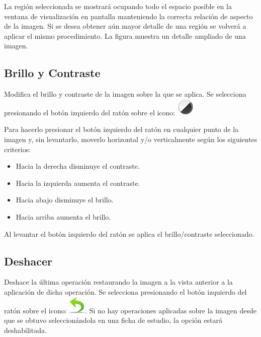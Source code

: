 \documentclass{plantilla-manual-usuario}
\begin{document}
La región seleccionada se mostrará ocupando todo el espacio posible en la ventana de visualización en pantalla manteniendo la correcta relación de aspecto de la imagen. Si se desea obtener aún mayor detalle de una región se volverá a aplicar el mismo procedimiento. La figura  muestra un detalle ampliado de una imagen.


\subsection{Brillo y Contraste}\label{subsectionBrilloyContrasteImagen}

Modifica el brillo y contraste de la imagen sobre la que se aplica. Se selecciona presionando el botón izquierdo del ratón sobre el icono: \includegraphics[scale=0.5]{images/contrast.png}

Para hacerlo presionar el botón izquierdo del ratón en cualquier punto de la imagen y, sin levantarlo, moverlo horizontal y/o verticalmente según los siguientes criterios:

\begin{itemize}
\item Hacia la derecha disminuye el contraste. 
\item Hacia la izquierda aumenta el contraste. 
\item Hacia abajo disminuye el brillo.
\item Hacia arriba aumenta el brillo.
\end{itemize}

Al levantar el botón izquierdo del ratón se aplica el brillo/contraste seleccionado. 

\subsection{Deshacer}

Deshace la última operación restaurando la imagen a la vista anterior a la aplicación de dicha operación. Se selecciona presionando el botón izquierdo del ratón sobre el icono: \includegraphics[scale=0.5]{images/undo.png}. Si no hay operaciones aplicadas sobre la imagen desde que se obtuvo seleccionándola en una ficha de estudio, la opción estará deshabilitada. 
\end{document}
